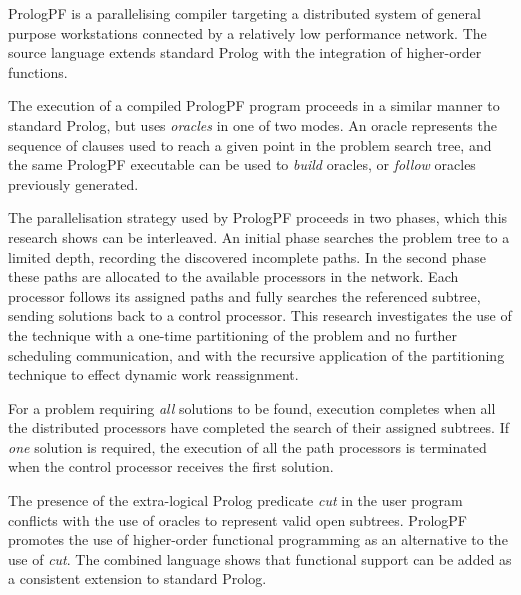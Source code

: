PrologPF is a parallelising compiler targeting a distributed system of
general purpose workstations connected by a relatively low performance
network.  The source language extends standard Prolog with the
integration of higher-order functions.

The execution of a compiled PrologPF program proceeds in a similar
manner to standard Prolog, but uses \textit{oracles} in one of two
modes.  An oracle represents the sequence of clauses used to reach a
given point in the problem search tree, and the same PrologPF executable
can be used to \textit{build} oracles, or \textit{follow} oracles
previously generated.

The parallelisation strategy used by PrologPF proceeds in two phases,
which this research shows can be interleaved.
An initial phase searches the problem tree to a limited depth,
recording the discovered incomplete paths.
In the second phase these paths are allocated
to the available processors in the network.  Each processor
follows its assigned paths and fully searches the referenced subtree,
sending solutions back to a control processor.  This research
investigates the use of the technique with a one-time partitioning
of the problem and no further scheduling communication, and with the
recursive application of the partitioning technique to effect
dynamic work reassignment.

For a problem requiring \textit{all} solutions to be found, execution
completes when all the distributed processors have completed the
search of their assigned subtrees.  If \textit{one} solution is
required, the execution of all the path processors is terminated when
the control processor receives the first solution.

The presence of the extra-logical Prolog predicate \textit{cut} in the
user program conflicts with the use of oracles to represent valid open
subtrees.  PrologPF promotes the use of higher-order functional
programming as an alternative to the use of \textit{cut}.  The
combined language shows that functional support can be added as a
consistent extension to standard Prolog.

